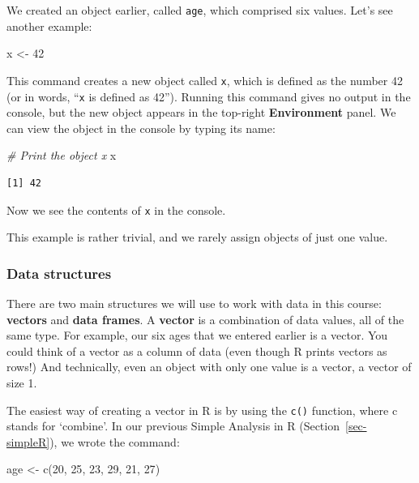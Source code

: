 \documentclass[
  a4paper,
]{memoir}
\newenvironment{Shaded}{\begin{snugshade}}{\end{snugshade}}
\newcommand{\CommentTok}[1]{\textcolor[rgb]{0.00,0.00,0.00}{\textit{#1}}}
\newcommand{\DecValTok}[1]{\textcolor[rgb]{0.00,0.00,0.00}{#1}}
\newcommand{\FunctionTok}[1]{\textcolor[rgb]{0.00,0.00,0.00}{#1}}
\newcommand{\NormalTok}[1]{\textcolor[rgb]{0.00,0.00,0.00}{#1}}
\newcommand{\OtherTok}[1]{\textcolor[rgb]{0.00,0.00,0.00}{#1}}
\begin{document}
We created an object earlier, called \texttt{age}, which comprised six
values. Let's see another example:

\begin{Shaded}
\begin{Highlighting}[]
\NormalTok{x }\OtherTok{\textless{}{-}} \DecValTok{42}
\end{Highlighting}
\end{Shaded}

This command creates a new object called \texttt{x}, which is defined as
the number 42 (or in words, ``\texttt{x} is defined as 42''). Running
this command gives no output in the console, but the new object appears
in the top-right \textbf{Environment} panel. We can view the object in
the console by typing its name:

\begin{Shaded}
\begin{Highlighting}[]
\CommentTok{\# Print the object x}
\NormalTok{x}
\end{Highlighting}
\end{Shaded}

\begin{verbatim}
[1] 42
\end{verbatim}

Now we see the contents of \texttt{x} in the console.

This example is rather trivial, and we rarely assign objects of just one
value.

\subsubsection{Data structures}\label{sec-data-structures}

There are two main structures we will use to work with data in this
course: \textbf{vectors} and \textbf{data frames}. A \textbf{vector} is
a combination of data values, all of the same type. For example, our six
ages that we entered earlier is a vector. You could think of a vector as
a column of data (even though R prints vectors as rows!) And
technically, even an object with only one value is a vector, a vector of
size 1.

The easiest way of creating a vector in R is by using the \texttt{c()}
function, where c stands for `combine'. In our previous Simple Analysis
in R (Section~\ref{sec-simpleR}), we wrote the command:

\begin{Shaded}
\begin{Highlighting}[]
\NormalTok{age }\OtherTok{\textless{}{-}} \FunctionTok{c}\NormalTok{(}\DecValTok{20}\NormalTok{, }\DecValTok{25}\NormalTok{, }\DecValTok{23}\NormalTok{, }\DecValTok{29}\NormalTok{, }\DecValTok{21}\NormalTok{, }\DecValTok{27}\NormalTok{)}
\end{Highlighting}
\end{Shaded}
\end{document}

